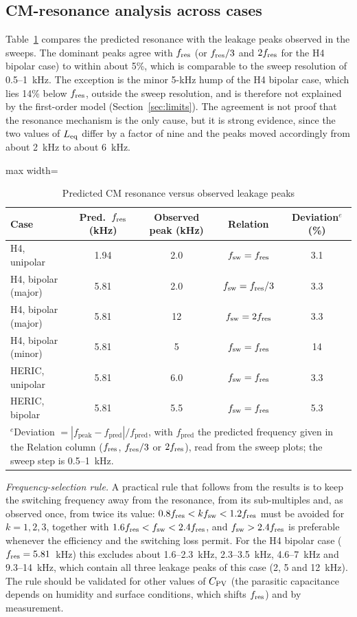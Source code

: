 \subsection{CM-resonance analysis across cases}
Table~\ref{tab:res} compares the predicted resonance with the leakage peaks observed in the sweeps. The dominant peaks agree with $f_{\mathrm{res}}$ (or $f_{\mathrm{res}}/3$ and $2f_{\mathrm{res}}$ for the H4 bipolar case) to within about 5\%, which is comparable to the sweep resolution of 0.5--1~kHz. The exception is the minor 5-kHz hump of the H4 bipolar case, which lies 14\% below $f_{\mathrm{res}}$, outside the sweep resolution, and is therefore not explained by the first-order model (Section~\ref{sec:limits}). The agreement is not proof that the resonance mechanism is the only cause, but it is strong evidence, since the two values of $L_{\mathrm{eq}}$ differ by a factor of nine and the peaks moved accordingly from about 2~kHz to about 6~kHz.

\begin{table}[!t]
\renewcommand{\arraystretch}{1.2}
\caption{Predicted CM resonance versus observed leakage peaks}
\label{tab:res}
\centering
\footnotesize
\begin{adjustbox}{max width=\columnwidth}
\begin{tabular}{lcccc}
\toprule
Case & Pred.\ $f_{\mathrm{res}}$ (kHz) & Observed peak (kHz) & Relation & Deviation$^{e}$ (\%) \\
\midrule
H4, unipolar   & 1.94 & 2.0 & $f_{\mathrm{sw}}=f_{\mathrm{res}}$ & 3.1 \\
H4, bipolar (major) & 5.81 & 2.0 & $f_{\mathrm{sw}}=f_{\mathrm{res}}/3$ & 3.3 \\
H4, bipolar (major) & 5.81 & 12 & $f_{\mathrm{sw}}=2f_{\mathrm{res}}$ & 3.3 \\
H4, bipolar (minor) & 5.81 & 5 & $f_{\mathrm{sw}}=f_{\mathrm{res}}$ & 14 \\
HERIC, unipolar & 5.81 & 6.0 & $f_{\mathrm{sw}}=f_{\mathrm{res}}$ & 3.3 \\
HERIC, bipolar  & 5.81 & 5.5 & $f_{\mathrm{sw}}=f_{\mathrm{res}}$ & 5.3 \\
\bottomrule
\multicolumn{5}{p{0.95\columnwidth}}{\footnotesize $^{e}$Deviation $=|f_{\mathrm{peak}}-f_{\mathrm{pred}}|/f_{\mathrm{pred}}$, with $f_{\mathrm{pred}}$ the predicted frequency given in the Relation column ($f_{\mathrm{res}}$, $f_{\mathrm{res}}/3$ or $2f_{\mathrm{res}}$), read from the sweep plots; the sweep step is 0.5--1~kHz.}
\end{tabular}
\end{adjustbox}
\end{table}

\emph{Frequency-selection rule.} A practical rule that follows from the results is to keep the switching frequency away from the resonance, from its sub-multiples and, as observed once, from twice its value: $0.8f_{\mathrm{res}}<kf_{\mathrm{sw}}<1.2f_{\mathrm{res}}$ must be avoided for $k=1,2,3$, together with $1.6f_{\mathrm{res}}<f_{\mathrm{sw}}<2.4f_{\mathrm{res}}$, and $f_{\mathrm{sw}}>2.4f_{\mathrm{res}}$ is preferable whenever the efficiency and the switching loss permit. For the H4 bipolar case ($f_{\mathrm{res}}=5.81$~kHz) this excludes about 1.6--2.3~kHz, 2.3--3.5~kHz, 4.6--7~kHz and 9.3--14~kHz, which contain all three leakage peaks of this case (2, 5 and 12~kHz). The rule should be validated for other values of $C_{\mathrm{PV}}$ (the parasitic capacitance depends on humidity and surface conditions, which shifts $f_{\mathrm{res}}$) and by measurement.

